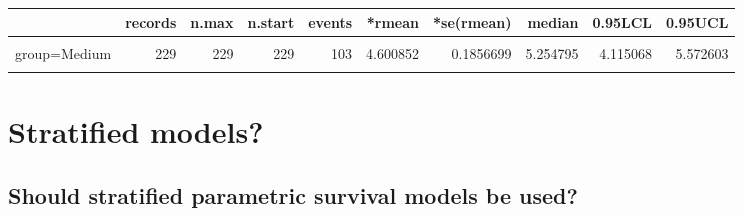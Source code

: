 \documentclass[]{article}
\begin{document}
\begin{table}[H]
\centering
\begin{tabular}{lrrrrrrrrr}
\toprule
  & records & n.max & n.start & events & *rmean & *se(rmean) & median & 0.95LCL & 0.95UCL\\
\midrule
\cellcolor{gray!6}{group=Good} & \cellcolor{gray!6}{229} & \cellcolor{gray!6}{229} & \cellcolor{gray!6}{229} & \cellcolor{gray!6}{51} & \cellcolor{gray!6}{5.934330} & \cellcolor{gray!6}{0.1616003} & \cellcolor{gray!6}{NA} & \cellcolor{gray!6}{NA} & \cellcolor{gray!6}{NA}\\
group=Medium & 229 & 229 & 229 & 103 & 4.600852 & 0.1856699 & 5.254795 & 4.115068 & 5.572603\\
\cellcolor{gray!6}{group=Poor} & \cellcolor{gray!6}{228} & \cellcolor{gray!6}{228} & \cellcolor{gray!6}{228} & \cellcolor{gray!6}{145} & \cellcolor{gray!6}{3.101736} & \cellcolor{gray!6}{0.1772520} & \cellcolor{gray!6}{2.183562} & \cellcolor{gray!6}{1.978082} & \cellcolor{gray!6}{2.619178}\\
\bottomrule
\end{tabular}
\end{table}

\newpage

\section{Stratified models?}\label{stratified-models}

\subsection{Should stratified parametric survival models be
used?}\label{should-stratified-parametric-survival-models-be-used}
\end{document}
